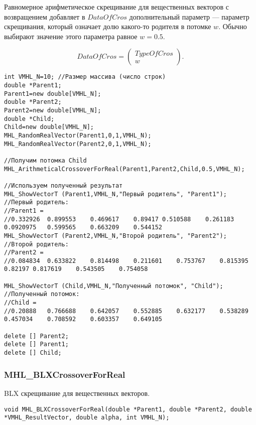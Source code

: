 \documentclass[a4paper,12pt]{article}
\begin{document}
Равномерное арифметическое скрещивание для вещественных векторов с возвращением добавляет в $ DataOfCros $ дополнительный параметр --- параметр скрещивания, который означает долю какого-то родителя в потомке $ w $. Обычно выбирают значение этого параметра равное $ w=0.5 $.

\begin{equation}
DataOfCros=\left( \begin{array}{c} TypeOfCros \\ w \end{array} \right).
\end{equation}


\begin{lstlisting}[label=code_use_MHL_ArithmeticalCrossoverForReal,caption=Пример использования]
int VMHL_N=10; //Размер массива (число строк)
double *Parent1;
Parent1=new double[VMHL_N];
double *Parent2;
Parent2=new double[VMHL_N];
double *Child;
Child=new double[VMHL_N];
MHL_RandomRealVector(Parent1,0,1,VMHL_N);
MHL_RandomRealVector(Parent2,0,1,VMHL_N);

//Получим потомка Child
MHL_ArithmeticalCrossoverForReal(Parent1,Parent2,Child,0.5,VMHL_N);

//Используем полученный результат
MHL_ShowVectorT (Parent1,VMHL_N,"Первый родитель", "Parent1");
//Первый родитель:
//Parent1 =	
//0.332926	0.899553	0.469617	0.89417	0.510588	0.261183	0.0920975	0.599565	0.663209	0.544152
MHL_ShowVectorT (Parent2,VMHL_N,"Второй родитель", "Parent2");
//Второй родитель:
//Parent2 =	
//0.084834	0.633822	0.814498	0.211601	0.753767	0.815395	0.82197	0.817619	0.543505	0.754058

MHL_ShowVectorT (Child,VMHL_N,"Полученный потомок", "Child");
//Полученный потомок:
//Child =	
//0.20888	0.766688	0.642057	0.552885	0.632177	0.538289	0.457034	0.708592	0.603357	0.649105

delete [] Parent2;
delete [] Parent1;
delete [] Child;
\end{lstlisting}

\subsubsection{MHL\_BLXCrossoverForReal}\label{MHL_BLXCrossoverForReal}

BLX скрещивание для вещественных векторов.


\begin{lstlisting}[label=code_syntax_MHL_BLXCrossoverForReal,caption=Синтаксис]
void MHL_BLXCrossoverForReal(double *Parent1, double *Parent2, double *VMHL_ResultVector, double alpha, int VMHL_N);
\end{lstlisting}
\end{document}
